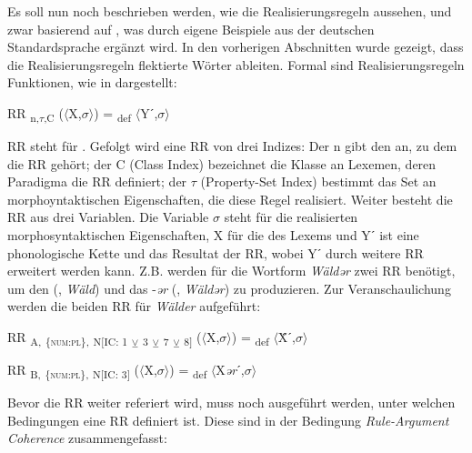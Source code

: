  Es soll nun noch beschrieben werden, wie die Realisierungsregeln aussehen, und zwar basierend auf \citet[40–46 und 50–53]{Stump2001}, was durch eigene Beispiele aus der deutschen Standardsprache ergänzt wird. In den vorherigen Abschnitten wurde gezeigt, dass die Realisierungsregeln flektierte Wörter ableiten. Formal sind Realisierungsregeln Funktionen, wie in  dargestellt:

\ea%
    \label{ex:key:11}
    RR \textsubscript{n,$\tau $,C} ($\langle$X,$\sigma$$\rangle$) = \textsubscript{def} $\langle$Yˊ,$\sigma$$\rangle$\\
    \z


RR steht für . Gefolgt wird eine RR von drei Indizes: Der  n gibt den  an, zu dem die RR gehört; der  C (Class Index) bezeichnet die Klasse an Lexemen, deren Paradigma die RR definiert; der  $\tau $ (Property-Set Index) bestimmt das Set an morphoyntaktischen Eigenschaften, die diese Regel realisiert. Weiter besteht die RR aus drei Variablen. Die Variable $\sigma $ steht für die realisierten morphosyntaktischen Eigenschaften, X für die  des Lexems und Yˊ ist eine phonologische Kette und das Resultat der RR, wobei Yˊ durch weitere RR erweitert werden kann. Z.B. werden für die Wortform \textit{Wäldər} zwei RR benötigt, um den  (, \textit{Wäld}) und das  -\textit{ər} (, \textit{Wäldər}) zu produzieren. Zur Veranschaulichung werden die beiden RR für \textit{Wälder} aufgeführt:

\ea%
    \label{ex:key:12}
RR \textsubscript{A,} \textsubscript{\{\textsc{num:pl}\},} \textsubscript{N[IC: 1} \textsubscript{${\veebar}$}\textsubscript{ 3} \textsubscript{${\veebar}$}\textsubscript{ 7} \textsubscript{${\veebar}$}\textsubscript{ 8]} ($\langle$X,$\sigma$$\rangle$) = \textsubscript{def} $\langle$Ẍˊ,$\sigma$$\rangle$
    \z



\ea%
    \label{ex:key:13}
   RR \textsubscript{B,} \textsubscript{\{\textsc{num:pl}\},} \textsubscript{N[IC: 3]} ($\langle$X,$\sigma$$\rangle$) = \textsubscript{def} $\langle$X\textit{ər}ˊ,$\sigma$$\rangle$
    \z

 Bevor die RR weiter referiert wird, muss noch ausgeführt werden, unter welchen Bedingungen eine RR definiert ist. Diese sind in der Bedingung {\textit{Rule-Argument Coherence}}  zusammengefasst:

